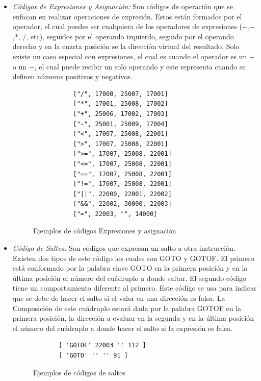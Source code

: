 \begin{itemize}
    \item \emph{Códigos de Expresiones y Asignación:} Son códigos de operación que se enfocan en realizar operaciones de expresión. Estos están formados por el operador, el cual puedes ser cualquiera de los operadores de expresiones ($+$,$-$,*, /, etc), seguidos por el operando izquierdo, seguido por el operando derecho y en la cuarta posición se la dirección virtual del resultado. Solo existe un caso especial con expresiones, el cual es cuando el operador es un $+$ o un $-$, el cual puede recibir un solo operando y este representa cuando se definen números positivos y negativos.
    
    \begin{figure}[!htbp]
        \centering
        \begin{lstlisting}
           ["/", 17000, 25007, 17001]
           ["*", 17001, 25008, 17002]
           ["+", 25006, 17002, 17003]
           ["-", 25001, 25009, 17004]
           ["<", 17007, 25008, 22001]
           [">", 17007, 25008, 22001]
           [">=", 17007, 25008, 22001]
           ["<=", 17007, 25008, 22001]
           ["==", 17007, 25008, 22001]
           ["!=", 17007, 25008, 22001]
           ["||", 22000, 22001, 22002]
           ["&&", 22002, 30000, 22003]
           ["=", 22003, "", 14000]
        \end{lstlisting}
        \caption{Ejemplos de códigos Expresiones y asignación}
        \label{fig:my_label}
    \end{figure}
    \FloatBarrier
    
    \item \emph{Código de Saltos:} Son códigos que expresan un salto a otra instrucción. Existen dos tipos de este código los cuales son GOTO y GOTOF. El primero está conformado por la palabra clave GOTO en la primera posición y en la última posición el número del cuádruplo a donde saltar. El segundo código tiene un comportamiento diferente al primero. Este código se usa para indicar que se debe de hacer el salto si el valor en una dirección es falsa. La Composición de este cuádruplo estará dada por la palabra GOTOF en la primera posición, la dirección a evaluar en la segunda y en la última posición el número del cuádruplo a donde hacer el salto si la expresión es falsa.
    
    \begin{figure}[!htbp]
    \centering
    \begin{lstlisting}
       [ 'GOTOF' 22003 '' 112 ]
       [ 'GOTO' '' '' 91 ]
    \end{lstlisting}
    \caption{Ejemplos de códigos de saltos}
    \label{fig:my_label}
\end{figure}
\FloatBarrier
    

\end{itemize}
